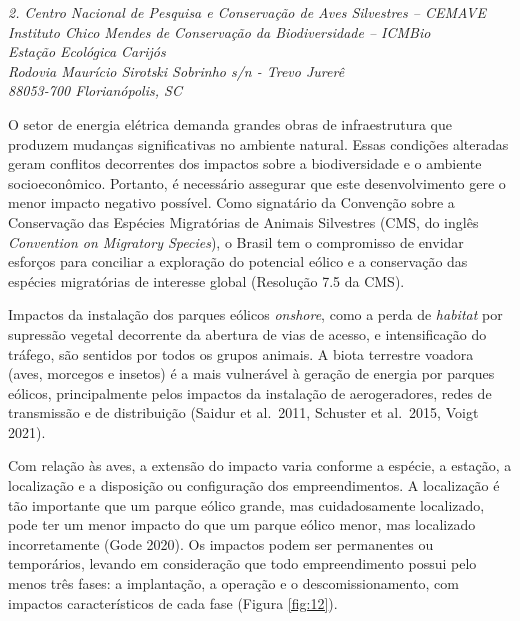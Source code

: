 \documentclass[
  oneside]{scrbook}
\begin{document}
\emph{2. Centro Nacional de Pesquisa e Conservação de Aves Silvestres -- CEMAVE}\\
\emph{Instituto Chico Mendes de Conservação da Biodiversidade -- ICMBio}\\
\emph{Estação Ecológica Carijós}\\
\emph{Rodovia Maurício Sirotski Sobrinho s/n - Trevo Jurerê}\\
\emph{88053-700 Florianópolis, SC}

O setor de energia elétrica demanda grandes obras de infraestrutura que produzem mudanças significativas no ambiente natural. Essas condições alteradas geram conflitos decorrentes dos impactos sobre a biodiversidade e o ambiente socioeconômico. Portanto, é necessário assegurar que este desenvolvimento gere o menor impacto negativo possível. Como signatário da Convenção sobre a Conservação das Espécies Migratórias de Animais Silvestres (CMS, do inglês \emph{Convention on Migratory Species}), o Brasil tem o compromisso de envidar esforços para conciliar a exploração do potencial eólico e a conservação das espécies migratórias de interesse global (Resolução 7.5 da CMS).

Impactos da instalação dos parques eólicos \emph{onshore}, como a perda de \emph{habitat} por supressão vegetal decorrente da abertura de vias de acesso, e intensificação do tráfego, são sentidos por todos os grupos animais. A biota terrestre voadora (aves, morcegos e insetos) é a mais vulnerável à geração de energia por parques eólicos, principalmente pelos impactos da instalação de aerogeradores, redes de transmissão e de distribuição (Saidur et al.~2011, Schuster et al.~2015, Voigt 2021).

Com relação às aves, a extensão do impacto varia conforme a espécie, a estação, a localização e a disposição ou configuração dos empreendimentos. A localização é tão importante que um parque eólico grande, mas cuidadosamente localizado, pode ter um menor impacto do que um parque eólico menor, mas localizado incorretamente (Gode 2020). Os impactos podem ser permanentes ou temporários, levando em consideração que todo empreendimento possui pelo menos três fases: a implantação, a operação e o descomissionamento, com impactos característicos de cada fase (Figura \ref{fig:12}).
\end{document}
